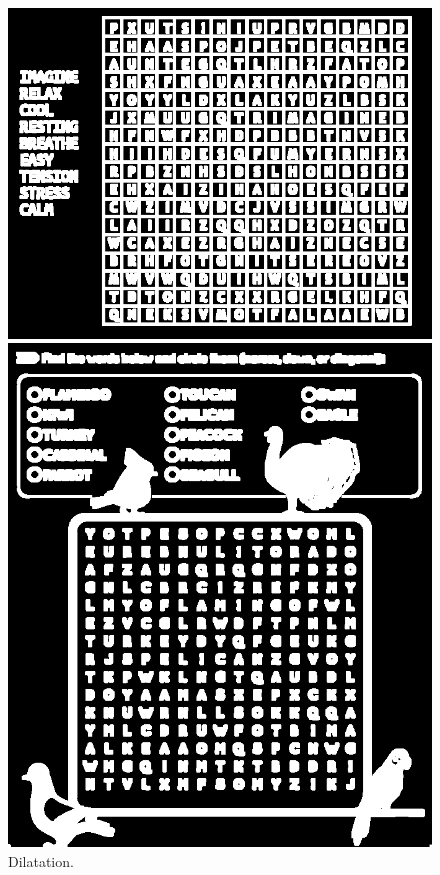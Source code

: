 \documentclass{article}
\begin{document}
\begin{figure}[H]
  \centering
      \includegraphics[width=\linewidth]{ressources/1level_1_image_1_08_dilated.png}
      \caption{}
    \endminipage\quad\quad\quad\quad
    \includegraphics[width=\linewidth]{ressources/3level_3_image_2_08_dilated.png}
    \caption{}
  \endminipage
  \caption{Dilatation.}
\end{figure}
\end{document}

